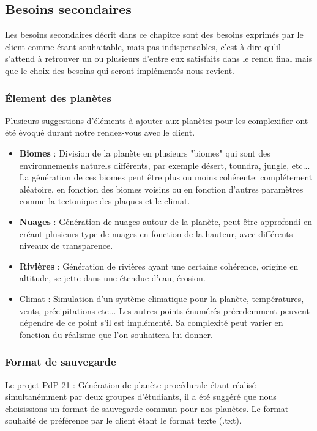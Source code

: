 \documentclass{article}
\begin{document}
\subsection{Besoins secondaires}\label{secondary_fn}
Les besoins secondaires décrit dans ce chapitre sont des besoins exprimés par le client comme étant souhaitable, mais pas indispensables, c'est à dire qu'il s'attend à retrouver un ou plusieurs d'entre eux satisfaits dans le rendu final mais que le choix des besoins qui seront implémentés nous revient.

\subsubsection{Élement des planètes}\label{sfn_planet_elements}
  Plusieurs suggestions d'éléments à ajouter aux planètes pour les complexifier ont été évoqué durant notre rendez-vous avec le client.
\begin{itemize}
    \item \textbf{Biomes} : Division de la planète en plusieurs "biomes" qui sont des environnements naturels différents, par exemple désert, toundra, jungle, etc... La génération de ces biomes peut être plus ou moins cohérente: complétement aléatoire, en fonction des biomes voisins ou en fonction d'autres paramètres comme la tectonique des plaques et le climat. 
    \item \textbf{Nuages} : Génération de nuages autour de la planète, peut être approfondi en créant plusieurs type de nuages en fonction de la hauteur, avec différents niveaux de transparence.
    \item \textbf{Rivières} : Génération de rivières ayant une certaine cohérence, origine en altitude, se jette dans une étendue d'eau, érosion.
    \item Climat : Simulation d'un système climatique pour la planète, températures, vents, précipitations etc... Les autres points énumérés précedemment peuvent dépendre de ce point s'il est implémenté. Sa complexité peut varier en fonction du réalisme que l'on souhaitera lui donner.
\end{itemize}
\subsubsection{Format de sauvegarde}\label{sfn_save_format}
 Le projet PdP 21 : Génération de planète procédurale étant réalisé simultanémment par deux groupes d'étudiants, il a été suggéré que nous choisissions un format de sauvegarde commun pour nos planètes. Le format souhaité de préférence par le client étant le format texte (.txt). 
\end{document}

